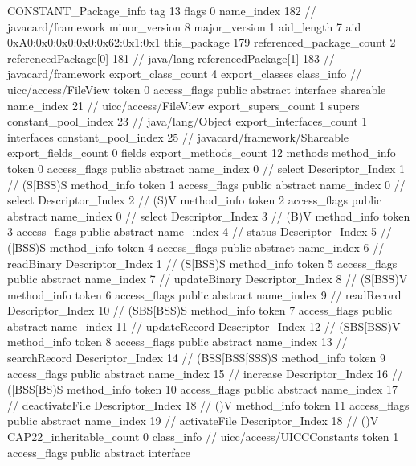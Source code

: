 {{{		}
		CONSTANT_Package_info {
			tag	13
			flags	0
			name_index	182		// javacard/framework
			minor_version	8
			major_version	1
			aid_length	7
			aid	0xA0:0x0:0x0:0x0:0x62:0x1:0x1
		}
	}
	this_package	179
	referenced_package_count	2
	referencedPackage[0]	181		// java/lang
	referencedPackage[1]	183		// javacard/framework
	export_class_count	4
	export_classes {
		class_info {		// uicc/access/FileView
			token	0
			access_flags	public abstract interface shareable
			name_index	21		// uicc/access/FileView
			export_supers_count	1
			supers {
				constant_pool_index	23		// java/lang/Object
			}
			export_interfaces_count	1
			interfaces {
				constant_pool_index	25		// javacard/framework/Shareable
			}
			export_fields_count	0
			fields {
			}
			export_methods_count	12
			methods {
				method_info {
					token	0
					access_flags	public abstract
					name_index	0		// select
					Descriptor_Index	1		// (S[BSS)S
				}
				method_info {
					token	1
					access_flags	public abstract
					name_index	0		// select
					Descriptor_Index	2		// (S)V
				}
				method_info {
					token	2
					access_flags	public abstract
					name_index	0		// select
					Descriptor_Index	3		// (B)V
				}
				method_info {
					token	3
					access_flags	public abstract
					name_index	4		// status
					Descriptor_Index	5		// ([BSS)S
				}
				method_info {
					token	4
					access_flags	public abstract
					name_index	6		// readBinary
					Descriptor_Index	1		// (S[BSS)S
				}
				method_info {
					token	5
					access_flags	public abstract
					name_index	7		// updateBinary
					Descriptor_Index	8		// (S[BSS)V
				}
				method_info {
					token	6
					access_flags	public abstract
					name_index	9		// readRecord
					Descriptor_Index	10		// (SBS[BSS)S
				}
				method_info {
					token	7
					access_flags	public abstract
					name_index	11		// updateRecord
					Descriptor_Index	12		// (SBS[BSS)V
				}
				method_info {
					token	8
					access_flags	public abstract
					name_index	13		// searchRecord
					Descriptor_Index	14		// (BSS[BSS[SSS)S
				}
				method_info {
					token	9
					access_flags	public abstract
					name_index	15		// increase
					Descriptor_Index	16		// ([BSS[BS)S
				}
				method_info {
					token	10
					access_flags	public abstract
					name_index	17		// deactivateFile
					Descriptor_Index	18		// ()V
				}
				method_info {
					token	11
					access_flags	public abstract
					name_index	19		// activateFile
					Descriptor_Index	18		// ()V
				}
			}
			CAP22_inheritable_count	0
		}
		class_info {		// uicc/access/UICCConstants
			token	1
			access_flags	public abstract interface
}}}
